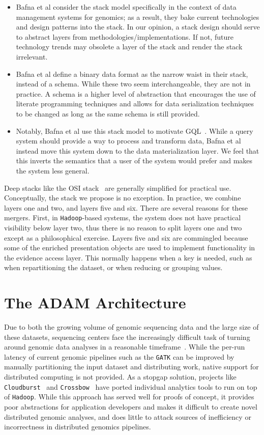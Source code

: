 \documentclass[phd]{ucbthesis}
\begin{document}
\begin{itemize}
\item Bafna et al consider the stack model specifically in the context of data management systems for
genomics; as a result, they bake current technologies and design patterns into the stack. In our opinion,
a stack design should serve to abstract layers from methodologies/implementations. If not, future
technology trends may obsolete a layer of the stack and render the stack irrelevant.
\item Bafna et al define a binary data format as the narrow waist in their stack, instead of a schema.
While these two seem interchangeable, they are not in practice. A schema is a higher level of abstraction
that encourages the use of literate programming techniques and allows for data serialization techniques
to be changed as long as the same schema is still provided.
\item Notably, Bafna et al use this stack model to motivate GQL~\cite{kozanitis14}. While a query system
should provide a way to process and transform data, Bafna et al instead move this system down to the
data materialization layer. We feel that this inverts the semantics that a user of the system would prefer
and makes the system less general.
\end{itemize}

Deep stacks like the OSI stack~\cite{zimmermann80} are generally simplified for practical use. Conceptually,
the stack we propose is no exception. In practice, we combine layers one and two, and layers five and six.
There are several reasons for these mergers. First, in \texttt{Hadoop}-based systems, the system does not have practical visibility
below layer two, thus there is no reason to split layers one and two except as a philosophical exercise.
Layers five and six are commingled because some of the enriched presentation objects are used to
implement functionality in the evidence access layer. This normally happens when a key is needed, such as
when repartitioning the dataset, or when reducing or grouping values.

\chapter{The \textsc{ADAM} Architecture}
\label{chap:architecture}

Due to both the growing volume of genomic sequencing data and the large size of these datasets,
sequencing centers face the increasingly difficult task of turning around genomic data analyses in a
reasonable timeframe~\cite{schadt10, stein10}. While the per-run latency of current genomic pipelines
such as the \texttt{GATK} can be improved by manually partitioning the input dataset and distributing
work, native support for distributed computing is not provided. As a stopgap solution, projects like
\texttt{Cloudburst}~\cite{schatz09} and \texttt{Crossbow}~\cite{langmead09} have ported individual
analytics tools to run on top of \texttt{Hadoop}. While this approach has served well for proofs of concept,
it provides poor abstractions for application developers and makes it difficult to create novel distributed
genomic analyses, and does little to attack sources of inefficiency or incorrectness in distributed
genomics pipelines.
\end{document}

